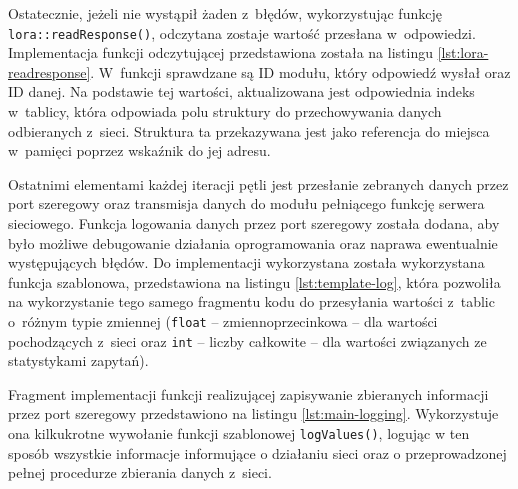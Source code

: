 



\FloatBarrier
Ostatecznie, jeżeli nie wystąpił żaden z~błędów, wykorzystując funkcję \texttt{lora::readResponse()}, odczytana zostaje
wartość przesłana w~odpowiedzi. Implementacja funkcji odczytującej przedstawiona została na listingu
\ref{lst:lora-readresponse}. W~funkcji sprawdzane są ID modułu, który odpowiedź wysłał oraz ID danej. Na podstawie tej
wartości, aktualizowana jest odpowiednia indeks w~tablicy, która odpowiada polu struktury do przechowywania danych
odbieranych z~sieci. Struktura ta przekazywana jest jako referencja do miejsca w~pamięci poprzez wskaźnik do jej adresu.



\FloatBarrier
Ostatnimi elementami każdej iteracji pętli jest przesłanie zebranych danych przez port szeregowy oraz transmisja danych
do modułu pełniącego funkcję serwera sieciowego. Funkcja logowania danych przez port szeregowy została dodana, aby było
możliwe debugowanie działania oprogramowania oraz naprawa ewentualnie występujących błędów. Do implementacji
wykorzystana została wykorzystana funkcja szablonowa, przedstawiona na listingu \ref{lst:template-log}, która pozwoliła
na wykorzystanie tego samego fragmentu kodu do przesyłania wartości z~tablic o~różnym typie zmiennej (\texttt{float} --
zmiennoprzecinkowa -- dla wartości pochodzących z~sieci oraz \texttt{int} -- liczby całkowite -- dla wartości związanych
ze statystykami zapytań).



Fragment implementacji funkcji realizującej zapisywanie zbieranych informacji przez port szeregowy przedstawiono na listingu
\ref{lst:main-logging}. Wykorzystuje ona kilkukrotne wywołanie funkcji szablonowej \texttt{logValues()}, logując w ten
sposób wszystkie informacje informujące o działaniu sieci oraz o przeprowadzonej pełnej procedurze zbierania danych
z~sieci.

